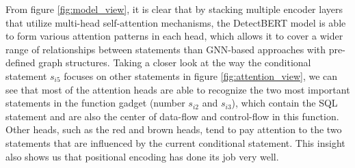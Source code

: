 \documentclass{ieeeaccess}
\begin{document}
\par From figure \ref{fig:model_view},  it is clear that  by stacking multiple encoder layers that utilize multi-head self-attention mechanisms, the DetectBERT model is able to form various attention patterns in each head, which allows it to cover a wider range of relationships between statements than GNN-based approaches with pre-defined graph structures. Taking a closer look at the way the conditional statement $s_{i5}$ focuses on other statements in figure \ref{fig:attention_view}, we can see that most of the attention heads are able to recognize the two most important statements in the function gadget (number $s_{i2}$ and $s_{i3}$), which contain the SQL statement and are also the center of data-flow and control-flow in this function. Other heads, such as the red and brown heads, tend to pay attention to the two statements that are influenced by the current conditional statement. This insight also shows us that positional encoding has done its job very well.
\end{document}
